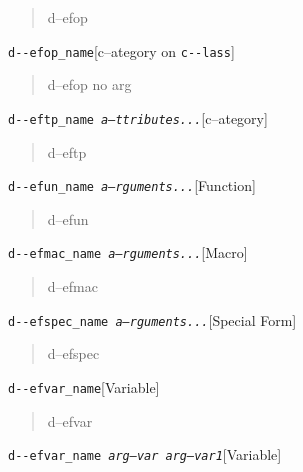 \documentclass{book}
\begin{document}
\begin{titlepage}
%
\begin{quote}
\unskip{\parskip=0pt\noindent}%
d--efop
\end{quote}

\noindent\texttt{d{-}{-}efop\_name}\hfill[c--ategory on \texttt{c{-}{-}lass}]

%
\begin{quote}
\unskip{\parskip=0pt\noindent}%
d--efop no arg
\end{quote}

\noindent\texttt{d{-}{-}eftp\_name \EmbracOn{}\textnormal{\textsl{a--ttributes...}}\EmbracOff{}}\hfill[c--ategory]

%
\begin{quote}
\unskip{\parskip=0pt\noindent}%
d--eftp
\end{quote}

\noindent\texttt{d{-}{-}efun\_name \EmbracOn{}\textnormal{\textsl{a--rguments...}}\EmbracOff{}}\hfill[Function]

%
\begin{quote}
\unskip{\parskip=0pt\noindent}%
d--efun
\end{quote}

\noindent\texttt{d{-}{-}efmac\_name \EmbracOn{}\textnormal{\textsl{a--rguments...}}\EmbracOff{}}\hfill[Macro]

%
\begin{quote}
\unskip{\parskip=0pt\noindent}%
d--efmac
\end{quote}

\noindent\texttt{d{-}{-}efspec\_name \EmbracOn{}\textnormal{\textsl{a--rguments...}}\EmbracOff{}}\hfill[Special Form]

%
\begin{quote}
\unskip{\parskip=0pt\noindent}%
d--efspec
\end{quote}

\noindent\texttt{d{-}{-}efvar\_name}\hfill[Variable]

%
\begin{quote}
\unskip{\parskip=0pt\noindent}%
d--efvar
\end{quote}

\noindent\texttt{d{-}{-}efvar\_name \EmbracOn{}\textnormal{\textsl{arg--var arg--var1}}\EmbracOff{}}\hfill[Variable]


\end{titlepage}
\end{document}
